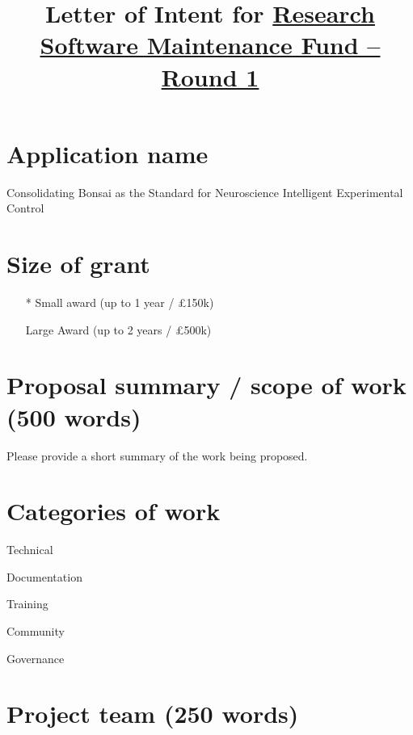 \documentclass[12pt]{article}
\title{Letter of Intent for \href{https://www.software.ac.uk/research-software-maintenance-fund/round-1}{Research Software Maintenance Fund -- Round 1}}
\author{}
\makeatletter
\newcommand*{\radiobutton}{%
  \@ifstar{\@radiobutton0}{\@radiobutton1}%
}
\newcommand*{\@radiobutton}[1]{%
  \begin{tikzpicture}
    \pgfmathsetlengthmacro\radius{height("X")/2}
    \draw[radius=\radius] circle;
    \ifcase#1 \fill[radius=.6*\radius] circle;\fi
  \end{tikzpicture}%
}
\newcommand{\cmark}{\ding{51}}%
\newcommand{\done}{\rlap{$\square$}{\raisebox{2pt}{\large\hspace{1pt}\cmark}}%
\hspace{-2.5pt}}
\newenvironment{instruction}{\par\color{red}}{\par}
\makeatother
\begin{document}
\maketitle

\section{Application name}

Consolidating Bonsai as the Standard for Neuroscience Intelligent Experimental Control

\section{Size of grant}

\begin{itemize}
\item[\radiobutton*] Small award (up to 1 year / £150k)
\item[\radiobutton] Large Award (up to 2 years / £500k)
\end{itemize}

\section{Proposal summary / scope of work (500 words)}

\begin{instruction}

Please provide a short summary of the work being proposed.

\end{instruction}



\section{Categories of work}

\begin{todolist}
	\item Technical
	\item[\done] Documentation
	\item[\done] Training
	\item[\done] Community
	\item Governance
\end{todolist}

\section{Project team (250 words)}
\end{document}
